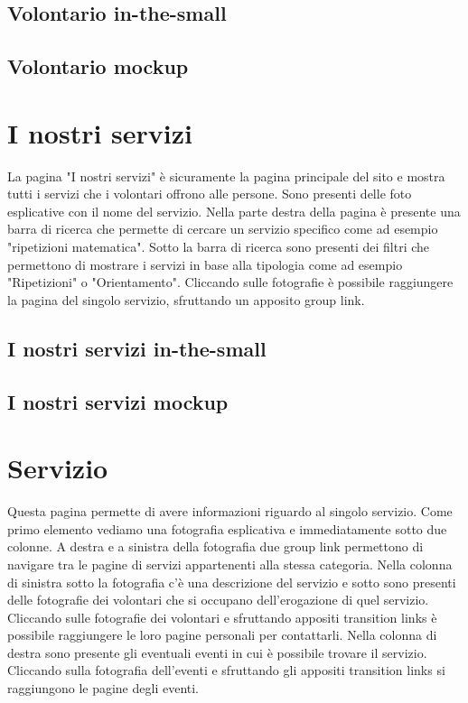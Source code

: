         \subsection{Volontario in-the-small}

        \subsection{Volontario mockup}

    \section{I nostri servizi}
    La pagina "I nostri servizi" è sicuramente la pagina principale del sito e
    mostra tutti i servizi che i volontari offrono alle persone. Sono presenti
    delle foto esplicative con il nome del servizio. Nella parte destra della
    pagina è presente una barra di ricerca che permette di cercare un servizio
    specifico come ad esempio "ripetizioni matematica". Sotto la barra di
    ricerca sono presenti dei filtri che permettono di mostrare i servizi in
    base alla tipologia come ad esempio "Ripetizioni" o "Orientamento".
    Cliccando sulle fotografie è possibile raggiungere la pagina del singolo
    servizio, sfruttando un apposito group link.
        \subsection{I nostri servizi in-the-small} 

        \subsection{I nostri servizi mockup}
    
    \section{Servizio}    
    Questa pagina permette di avere informazioni riguardo al singolo servizio.
    Come primo elemento vediamo una fotografia esplicativa e immediatamente
    sotto due colonne. A destra e a sinistra della fotografia due group link
    permettono di navigare tra le pagine di servizi appartenenti alla stessa
    categoria. Nella colonna di sinistra sotto la fotografia c'è una descrizione
    del servizio e sotto sono presenti delle fotografie dei volontari che si
    occupano dell'erogazione di quel servizio. Cliccando sulle fotografie dei
    volontari e sfruttando appositi transition links è possibile raggiungere le
    loro pagine personali per contattarli. Nella colonna di destra sono presente
    gli eventuali eventi in cui è possibile trovare il servizio. Cliccando sulla
    fotografia dell'eventi e sfruttando gli appositi transition links si
    raggiungono le pagine degli eventi.

